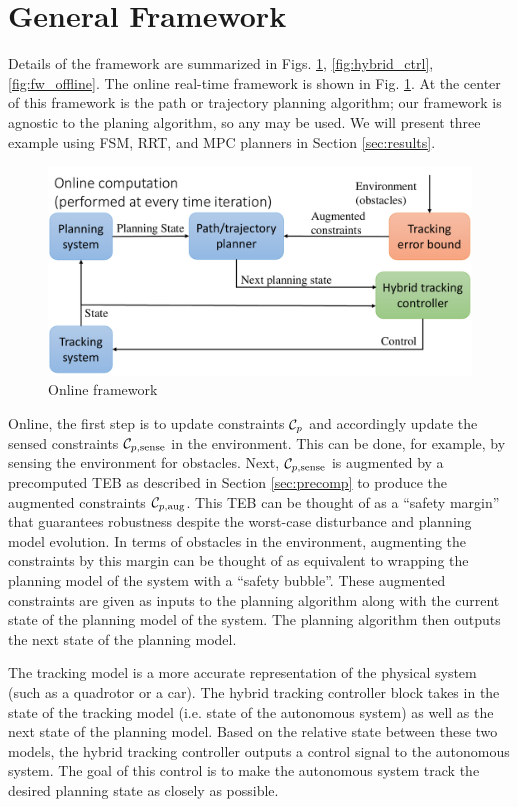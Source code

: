 \section{General Framework \label{sec:framework}}
Details of the framework are summarized in Figs. \ref{fig:fw_online}, \ref{fig:hybrid_ctrl}, \ref{fig:fw_offline}. 
The online real-time framework is shown in Fig. \ref{fig:fw_online}. 
At the center of this framework is the path or trajectory planning algorithm; our framework is agnostic to the planing algorithm, so any may be used. 
We will present three example using FSM, RRT, and MPC planners in Section \ref{sec:results}.
\begin{figure}[h!]
  \centering
	\includegraphics[width=1\columnwidth]{fig/framework_online}
	\caption{Online framework}
	\label{fig:fw_online}
\end{figure}

Online, the first step is to update constraints $\mathcal C_p$ and accordingly update the sensed constraints $\mathcal C_{p,\text{sense}}$ in the environment.
This can be done, for example, by sensing the environment for obstacles.
Next, $\mathcal C_{p,\text{sense}}$ is augmented  by a precomputed TEB as described in Section \ref{sec:precomp} to produce the augmented constraints $\mathcal C_{p,\text{aug}}$. 
This TEB can be thought of as a ``safety margin'' that guarantees robustness despite the worst-case disturbance and planning model evolution. 
In terms of obstacles in the environment, augmenting the constraints by this margin can be thought of as equivalent to wrapping the planning model of the system with a ``safety bubble''. 
These augmented constraints are given as inputs to the planning algorithm along with the current state of the planning model of the system. 
The planning algorithm then outputs the next state of the planning model.

The tracking model is a more accurate representation of the physical system (such as a quadrotor or a car). 
The hybrid tracking controller block takes in the state of the tracking model (i.e. state of the autonomous system) as well as the next state of the planning model. 
Based on the relative state between these two models, the hybrid tracking controller outputs a control signal to the autonomous system. 
The goal of this control is to make the autonomous system track the desired planning state as closely as possible.

